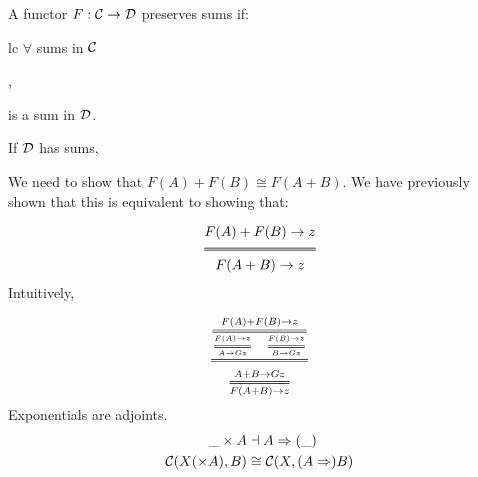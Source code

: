 \begin{example}
A functor $F: \mathcal{C} \to \mathcal{D}$ preserves sums if:

  \begin{center}
    \begin{tabular}[t]{lc}
    $\forall$ sums in $\mathcal{C}$
    ,
    is a sum in $\mathcal{D}$.
    \end{tabular}
  \end{center}

If $\mathcal{D}$ has sums, 

\begin{center}
\end{center} 

We need to show that $F(A) + F(B) \cong F(A + B)$. We have previously shown
that this is equivalent to showing that: 

\[ 
  \Efrac
    {F(A) + F(B) \to z}
    {F(A + B) \to z}
\]

Intuitively,

\LARGE\[
  \Efrac
  {
  \Efrac
    {F(A) + F(B) \to z} 
    { \Efrac 
      {F(A) \to z}  
      {A \to G z}
      \quad 
      \Efrac 
      {F(B) \to z}
      {B \to G z}
    }
  }
  {
    \Efrac 
    {A + B \to G z}
    {F(A + B) \to z}
  }
\]

\end{example}

\begin{example}
  Exponentials are adjoints.
  \begin{align*}
    \_ \times A &\dashv A \Rightarrow (\_) \\
    \mathcal{C}(X (\times A), B) &\cong \mathcal{C}(X, (A \Rightarrow) B)
  \end{align*}
\end{example} 

